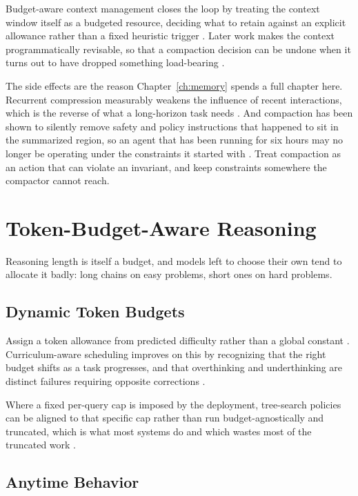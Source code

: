 \documentclass[11pt]{book}
\begin{document}
Budget-aware context management closes the loop by treating the context window itself as a budgeted resource, deciding what to retain against an explicit allowance rather than a fixed heuristic trigger \cite{contextbudget2026}. Later work makes the context programmatically revisable, so that a compaction decision can be undone when it turns out to have dropped something load-bearing \cite{contextenv2026}.

The side effects are the reason Chapter~\ref{ch:memory} spends a full chapter here. Recurrent compression measurably weakens the influence of recent interactions, which is the reverse of what a long-horizon task needs \cite{compressreliab2026}. And compaction has been shown to silently remove safety and policy instructions that happened to sit in the summarized region, so an agent that has been running for six hours may no longer be operating under the constraints it started with \cite{govdecay2026}. Treat compaction as an action that can violate an invariant, and keep constraints somewhere the compactor cannot reach.

\section{Token-Budget-Aware Reasoning}

Reasoning length is itself a budget, and models left to choose their own tend to allocate it badly: long chains on easy problems, short ones on hard problems.

\subsection{Dynamic Token Budgets}

Assign a token allowance from predicted difficulty rather than a global constant \cite{tokenbudget2025}. Curriculum-aware scheduling improves on this by recognizing that the right budget shifts as a task progresses, and that overthinking and underthinking are distinct failures requiring opposite corrections \cite{curriculumbudget2026}.

Where a fixed per-query cap is imposed by the deployment, tree-search policies can be aligned to that specific cap rather than run budget-agnostically and truncated, which is what most systems do and which wastes most of the truncated work \cite{treebudget2026}.

\subsection{Anytime Behavior}
\end{document}
